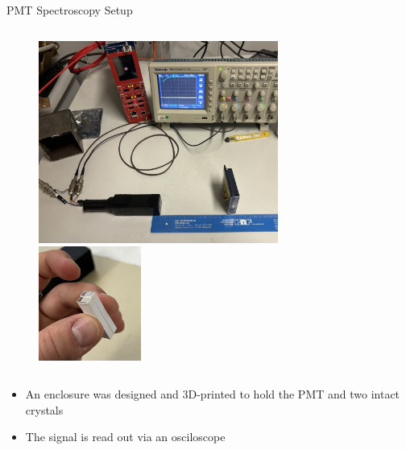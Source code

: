 \begin{columnframe}{PMT Spectroscopy Setup}
    \begin{column}{0.5\textwidth}
        \begin{figure}
            \centering
            \includegraphics[width=0.7\textwidth, frame]{images/pmt_spectroscopy_setup.jpg}
            \includegraphics[width=0.3\textwidth, frame]{images/wrapped_crystals.jpg}
        \end{figure}
    \end{column}
    \begin{column}{0.5\textwidth}
        \begin{itemize}
            \item An enclosure was designed and 3D-printed to hold the PMT and two intact crystals
            \item The signal is read out via an osciloscope
        \end{itemize}
    \end{column}
\end{columnframe}

